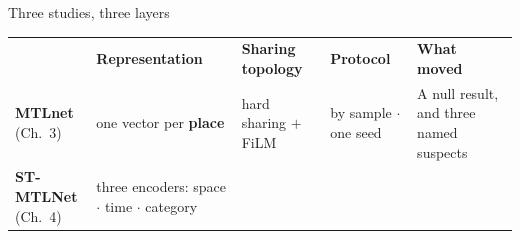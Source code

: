 \documentclass{beamer}
\begin{document}
\begin{frame}{Three studies, three layers}
    \vspace{0pt}%
    \vfill
    {\centering
    \setlength{\tabcolsep}{2.5pt}
    \renewcommand{\arraystretch}{1.5}\begin{tabular}{@{}p{1.6cm} p{2.3cm} p{2.2cm} p{2.1cm} p{5.0cm}@{}}
        \toprule
         & {\scriptsize\color{black!70}\raggedright\textbf{Representation}\par}
         & {\scriptsize\color{black!70}\raggedright\textbf{Sharing topology}\par}
         & {\scriptsize\color{black!70}\raggedright\textbf{Protocol}\par}
         & {\raggedright\textbf{What moved}\par} \\
        \midrule
        {\scriptsize\raggedright \textbf{MTLnet}\\(Ch.~3)\par}
            & {\scriptsize\color{black!70}\raggedright one vector per \textbf{place}\par}
            & {\scriptsize\color{black!70}\raggedright hard sharing $+$ FiLM\par}
            & {\scriptsize\color{black!70}\raggedright by sample $\cdot$ one seed\par}
            & {\large\raggedright \alert{A null result}, and three named suspects\par} \\
        \addlinespace
        {\scriptsize\raggedright \textbf{ST-MTLNet}\\(Ch.~4)\par}
            & {\scriptsize\color{black!70}\raggedright three encoders: space $\cdot$ time $\cdot$ category\par}

\end{tabular}}
\end{frame}
\end{document}
